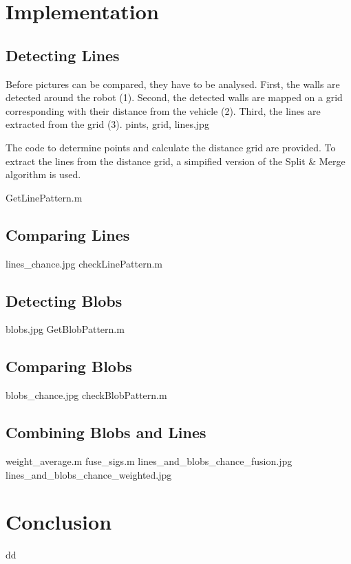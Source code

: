 \documentclass[12pt]{article}
\begin{document}
\clearpage

\section{Implementation}
\subsection{Detecting Lines}
Before pictures can be compared, they have to be analysed. First, the walls are detected around the robot (1). Second, the detected walls are mapped on a grid corresponding with their distance from the vehicle (2). Third, the lines are extracted from the grid (3).
pints, grid, lines.jpg

The code to determine points and calculate the distance grid are provided. To extract the lines from the distance grid, a simpified version of the Split \& Merge algorithm is used. 

GetLinePattern.m
 
\subsection{Comparing Lines}
lines_chance.jpg
checkLinePattern.m

\subsection{Detecting Blobs}
blobs.jpg
GetBlobPattern.m

\subsection{Comparing Blobs}
blobs_chance.jpg
checkBlobPattern.m

\subsection{Combining Blobs and Lines}
weight_average.m
fuse_sigs.m
lines_and_blobs_chance_fusion.jpg
lines_and_blobs_chance_weighted.jpg
\section{Conclusion}
dd
\end{document}
